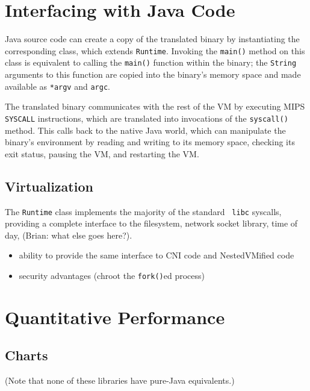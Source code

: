 \documentclass{acmconf}
\begin{document}
\section{Interfacing with Java Code}

Java source code can create a copy of the translated binary by
instantiating the corresponding class, which extends {\tt Runtime}.
Invoking the {\tt main()} method on this class is equivalent to
calling the {\tt main()} function within the binary; the {\tt String}
arguments to this function are copied into the binary's memory space
and made available as {\tt **argv} and {\tt argc}.

The translated binary communicates with the rest of the VM by
executing MIPS {\tt SYSCALL} instructions, which are translated into
invocations of the {\tt syscall()} method.  This calls back to the
native Java world, which can manipulate the binary's environment by
reading and writing to its memory space, checking its exit status,
pausing the VM, and restarting the VM.


\subsection{Virtualization}

The {\tt Runtime} class implements the majority of the standard {\tt
libc} syscalls, providing a complete interface to the filesystem,
network socket library, time of day, (Brian: what else goes here?).

\begin{itemize}

\item ability to provide the same interface to CNI code and
      NestedVMified code
      
\item security advantages (chroot the {\tt fork()}ed process)

\end{itemize}


\section{Quantitative Performance}

\subsection{Charts}

(Note that none of these libraries have pure-Java equivalents.)
\end{document}

